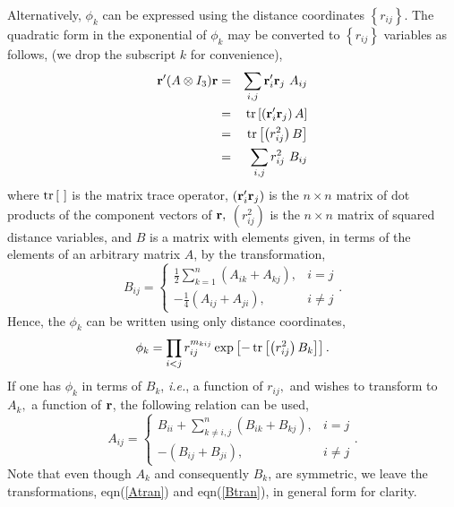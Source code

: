 Alternatively, $\phi _k$ can be expressed using the distance coordinates $%
\left\{ r_{ij}\right\} $. The quadratic form in the exponential of $\phi _k$
may be converted to $\left\{ r_{ij}\right\} $ variables as follows, (we drop
the subscript $k$ for convenience), 
\begin{eqnarray}
{\bf r}^{\prime }(A\otimes I_3){\bf r} &=&\sum_{i,j}{\bf r}_i^{\prime }{\bf r%
}_j\,\,A_{ij} \\
&=&%
\mathop{\rm tr}%
\left[ \left( {\bf r}_i^{\prime }{\bf r}_j\right) A\right] \\
&=&%
\mathop{\rm tr}%
\left[ \left( r_{ij}^2\right) B\right] \\
&=&\sum_{i,j}r_{ij}^2\,\,B_{ij}
\end{eqnarray}
where $%
\mathop{\rm tr}%
\left[ \,\,\right] $ is the matrix trace operator, $\left( {\bf r}_i^{\prime
}{\bf r}_j\right) $ is the $n\times n$ matrix of dot products of the
component vectors of ${\bf r},$ $\left( r_{ij}^2\right) $ is the $n\times n$
matrix of squared distance variables, and $B$ is a matrix with elements
given, in terms of the elements of an arbitrary matrix $A$, by the
transformation, 
\begin{equation}
B_{ij}=\left\{ 
\begin{array}{ll}
\frac 12%
\mathop{\displaystyle \sum }%
\limits_{k=1}^n\left( A_{ik}+A_{kj}\right) , & i=j \\ 
-\frac 14\left( A_{ij}+A_{ji}\right) , & i\neq j
\end{array}
\right. .  \label{Btran}
\end{equation}
Hence, the $\phi _k$ can be written using only distance coordinates, 
\begin{equation}
\phi _k=\prod_{i<j}r_{ij}^{m_{kij}}\exp \left[ -%
\mathop{\rm tr}%
\left[ \left( r_{ij}^2\right) B_k\right] \right] .
\end{equation}
If one has $\phi _k$ in terms of $B_k$, {\it i.e.}, a function of $r_{ij}, $
and wishes to transform to $A_k,$ a function of ${\bf r}$, the following
relation can be used, 
\begin{equation}
A_{ij}=\left\{ 
\begin{array}{ll}
B_{ii}+%
\mathop{\displaystyle \sum }%
\limits_{k\neq i,j}^n\left( B_{ik}+B_{kj}\right) , & i=j \\ 
-\left( B_{ij}+B_{ji}\right) , & i\neq j
\end{array}
\right. .  \label{Atran}
\end{equation}
Note that even though $A_k$ and consequently $B_k$, are symmetric, we leave
the transformations, eqn(\ref{Atran}) and eqn(\ref{Btran}), in general form
for clarity.

